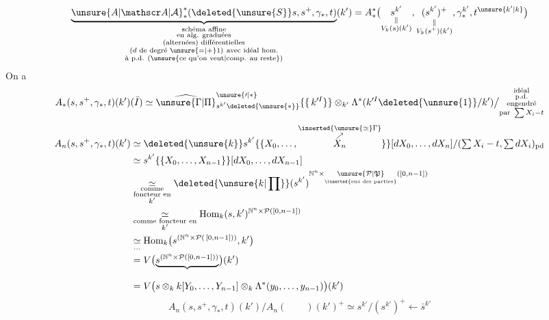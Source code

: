 \[
 \underbrace{\unsure{A|\mathscr A|\mathcal A}_*^*(\deleted{\unsure{S}}s,s^+,\gamma_*,t)}_{\substack{\text{schéma affine}\\\text{en alg. graduées}\\\text{(alternées) différentielles}\\\text{(}d\text{ de degré }\unsure{=|+}1)\ \text{avec idéal hom.}\\\text{à p.d. (\unsure{ce qu'on veut|comp. au reste})}}}(k')
 =A_*^*\bigl(\underset{\substack{\Vert\\V_k(s)(k')}}{s^{k'}},
 \underset{\substack{\Vert\\V_k(s^+)(k')}}{(s^{k'})^+},\gamma_*^{k'},t^{\unsure{k'|k}}\bigr)
\]
On a
\[
 A_*(s,s^+,\gamma_*,t)(k')(\bar I)
 \simeq \widehat{\unsure{\Gamma|\Pi}}_{s^{k'}\deleted{\unsure{*}}}^{\unsure{\prime|*}}\{\{\,k'^{I}\}\}
 \otimes_{k'}\Lambda^*(k'^{I}\deleted{\unsure{1}}/k')\big/
 \substack{\text{idéal}\\\text{p.d.}\\\text{engendré}\\\text{par }\sum X_i-t}
\]
\[
\begin{aligned}
 A_n(s,s^+,\gamma_*,t)(k')&\simeq\deleted{\unsure{k}}s^{k'}\{\{X_0,\ldots,\overset{\substack{\inserted{\unsure{\simeq}\Gamma}\\\nearrow}}{X_n}\}\}
 [dX_0,\ldots,dX_n]/(\textstyle\sum X_i-t,\sum dX_i)_{\mathrm{pd}}\\
 &\simeq s^{k'}\{\{X_0,\ldots,X_{n-1}\}\}[dX_0,\ldots,dX_{n-1}]\\
 &\underset{\substack{\text{comme}\\\text{foncteur en}\\k'}}{\simeq}
 \deleted{\unsure{k|\prod}}(s^{k'})^{\mathbb N^n\times\underset{\text{\inserted{ens des parties}}}{\unsure{\mathcal P|\mathfrak P}}([0,n-1])}\\
 &\underset{\substack{\text{comme foncteur en}\\ k'}}{\simeq}
 \operatorname{Hom}_k(s,k')^{\mathbb N^n\times\mathcal P([0,n-1])}\\
 &\underset{\ldots}{\simeq}\operatorname{Hom}_k\bigl(s^{(\mathbb N^n\times\mathcal P(\,[0,n-1]) )},k'\bigr)\\
 &= V\bigl(\underbrace{s^{(\mathbb N^n\times\mathcal P([0,n-1]))}}_{\vphantom{X}}\bigr)(k')\\
 &= V\bigl(s\otimes_k k[Y_0,\ldots,Y_{n-1}]\otimes_k\Lambda^*(y_0,\ldots,y_{n-1})\bigr)(k')
\end{aligned}
\]
\[
 A_n(s,s^+,\gamma_*,t)(k')/A_n(\qquad)(k')^+
 \simeq s^{k'}/(s^{k'})^+\longleftarrow\bar s^{k'}
\]
